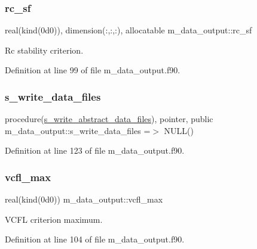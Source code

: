 \subsubsection{\texorpdfstring{rc\+\_\+sf}{rc\_sf}}
{\footnotesize\ttfamily real(kind(0d0)), dimension(\+:,\+:,\+:), allocatable m\+\_\+data\+\_\+output\+::rc\+\_\+sf}



Rc stability criterion. 



Definition at line 99 of file m\+\_\+data\+\_\+output.\+f90.

\mbox{\label{namespacem__data__output_a1ba4e8126b198fb2147d4d9b60f74e44}} 
\subsubsection{\texorpdfstring{s\+\_\+write\+\_\+data\+\_\+files}{s\_write\_data\_files}}
{\footnotesize\ttfamily procedure(\hyperlink{interfacem__data__output_1_1s__write__abstract__data__files}{s\+\_\+write\+\_\+abstract\+\_\+data\+\_\+files}), pointer, public m\+\_\+data\+\_\+output\+::s\+\_\+write\+\_\+data\+\_\+files =$>$ N\+U\+LL()}



Definition at line 123 of file m\+\_\+data\+\_\+output.\+f90.

\mbox{\label{namespacem__data__output_ada9b22b5a158b2ce980f43cec00a1ac6}} 
\subsubsection{\texorpdfstring{vcfl\+\_\+max}{vcfl\_max}}
{\footnotesize\ttfamily real(kind(0d0)) m\+\_\+data\+\_\+output\+::vcfl\+\_\+max}



V\+C\+FL criterion maximum. 



Definition at line 104 of file m\+\_\+data\+\_\+output.\+f90.

